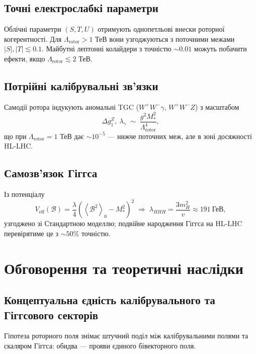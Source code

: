 \documentclass[11pt,a4paper]{article}
\newcommand{\grade}[2]{\left\langle #1 \right\rangle_{#2}}
\newcommand{\scal}[1]{\grade{#1}{0}}
\newcommand{\Biv}{\mathcal{B}}
\theoremstyle{definition}
\theoremstyle{plain}
\theoremstyle{remark}
\begin{document}
\subsection{Точні електрослабкі параметри}

Облічні параметри $(S,T,U)$ отримують однопетльові внески роторної когерентності. Для $\Lambda_{\text{rotor}}>1$ ТеВ вони узгоджуються з поточними межами $|S|,|T|\lesssim 0{.}1$. Майбутні лептонні колайдери з точністю $\sim 0{.}01$ можуть побачити ефекти, якщо $\Lambda_{\text{rotor}}\lesssim 2$ ТеВ.

\subsection{Потрійні калібрувальні зв’язки}

Самодії ротора індукують аномальні TGC ($W^+W^-\gamma$, $W^+W^-Z$) з масштабом
\begin{equation}
  \Delta g_1^Z,\ \lambda_\gamma \;\sim\; \frac{g^2 M_\ast^2}{\Lambda_{\text{rotor}}^4},
\end{equation}
що при $\Lambda_{\text{rotor}}=1$ ТеВ дає $\sim 10^{-5}$ — нижче поточних меж, але в зоні досяжності HL-LHC.

\subsection{Самозв’язок Гіггса}

Із потенціалу
\begin{equation}
  V_{\text{eff}}(\Biv) = \frac{\lambda}{4}(\scal{\Biv^2}-M_\ast^2)^2
  \;\Rightarrow\;
  \lambda_{HHH} = \frac{3m_H^2}{v} \approx 191~\text{ГеВ},
\end{equation}
узгоджено зі Стандартною моделлю; подвійне народження Гіггса на HL-LHC перевірятиме це з $\sim 50\%$ точністю.

\vspace{1em}

\section{Обговорення та теоретичні наслідки}\label{sec:discussion}

\subsection{Концептуальна єдність калібрувального та Гіггсового секторів}

Гіпотеза роторного поля знімає штучний поділ між калібрувальними полями та скаляром Гіггса: обидва — прояви єдиного бівекторного поля.
\end{document}
